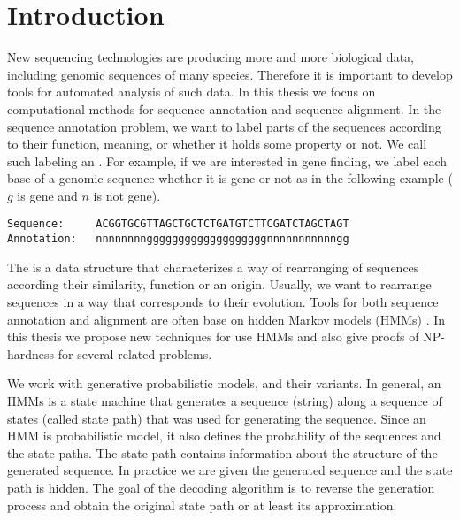 \chapter{Introduction}

New sequencing technologies are producing more and more biological data,
including genomic sequences of many species. Therefore it is important to
develop tools for automated analysis of such data. In this thesis we focus on
computational methods for sequence annotation and sequence alignment.  In the
sequence annotation problem, we want to label parts of the sequences according
to their function, meaning, or whether it holds some property or not. We call
such labeling an . For example, if we are interested in
gene finding, we label each base of a genomic sequence whether it is
gene or not as in the following example ($g$ is gene and $n$ is not gene).
\begin{verbatim}
Sequence:     ACGGTGCGTTAGCTGCTCTGATGTCTTCGATCTAGCTAGT 
Annotation:   nnnnnnnngggggggggggggggggggnnnnnnnnnnngg
\end{verbatim}
The  is a data structure
that characterizes a way of rearranging of sequences according their
similarity, function or an origin.  Usually, we want to rearrange sequences in
a way that corresponds to their evolution.  Tools for both
sequence annotation and alignment are often base on hidden Markov models (HMMs)
\cite{Durbin1998,Alexanderson2004,Brejova2005, FEAST2011,Krogh2001,Majoros2005,
Meyer2002,Nanasi2010,Pairagon2009, Schultz2006,Kovac2012,Pachter2002,
Liu2010,Brown2010, Lunter2008}.  In this thesis we propose new techniques for
use HMMs and also give proofs of NP-hardness for several related problems.

We work with generative probabilistic models,  and their variants. In general, an HMMs is a state machine that
generates a sequence (string) along a sequence of states (called state path)
that was used for generating the sequence. Since an HMM is probabilistic model,
it also defines the probability of the sequences and the state paths. The state
path contains information about the structure of the generated sequence. In
practice we are given the generated sequence and the state path is hidden. The
goal of the decoding algorithm is to reverse the generation process and obtain
the original state path or at least its approximation.

